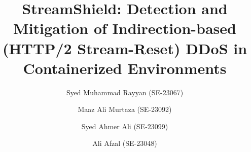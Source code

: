 \documentclass[a4paper,fleqn]{cas-dc}
\begin{document}
\let\WriteBookmarks\relax
\def\floatpagepagefraction{1}
\def\textpagefraction{.001}

\setcounter{topnumber}{4}
\setcounter{bottomnumber}{3}
\setcounter{totalnumber}{8}
\setcounter{dbltopnumber}{4}
\renewcommand{\topfraction}{0.95}
\renewcommand{\bottomfraction}{0.85}
\renewcommand{\textfraction}{0.05}
\renewcommand{\floatpagefraction}{0.5}
\renewcommand{\dbltopfraction}{0.95}
\renewcommand{\dblfloatpagefraction}{0.5}


\title[mode=title]{StreamShield: Detection and Mitigation of Indirection-based (HTTP/2 Stream-Reset) DDoS in Containerized Environments}

\author[1]{Syed Muhammad Rayyan (SE-23067)}
\author[1]{Maaz Ali Murtaza (SE-23092)}
\author[1]{Syed Ahmer Ali (SE-23099)}
\author[1]{Ali Afzal (SE-23048)}

\end{document}
